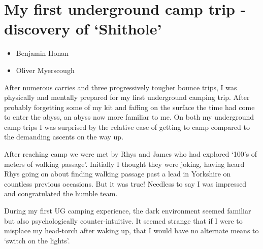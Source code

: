 \section{My first underground camp trip - discovery of `Shithole'}

{\begin{itemize}
	\item Benjamin Honan
	\item Oliver Myerscough
\end{itemize}}{\explo}

After numerous carries and three progressively tougher bounce trips, I was physically and
mentally prepared for my first underground camping trip. After probably forgetting some of my kit and faffing on the surface the time had come to enter the abyss, an abyss now more familiar to me. On both my underground camp trips I was surprised by the relative ease of getting to camp compared to the demanding ascents on the way up. 


After reaching camp we were met by Rhys and James who had explored `100's of meters of walking passage'. Initially I thought they were joking, having heard Rhys going on about finding walking passage past a lead in Yorkshire on countless previous occasions. But it was true! Needless to say I was impressed and congratulated the humble team.

During my first UG camping experience, the dark environment seemed familiar but also psychologically counter-intuitive. It seemed strange that if I were to misplace my head-torch after waking up, that I would have no alternate means to `switch on the lights'. 

